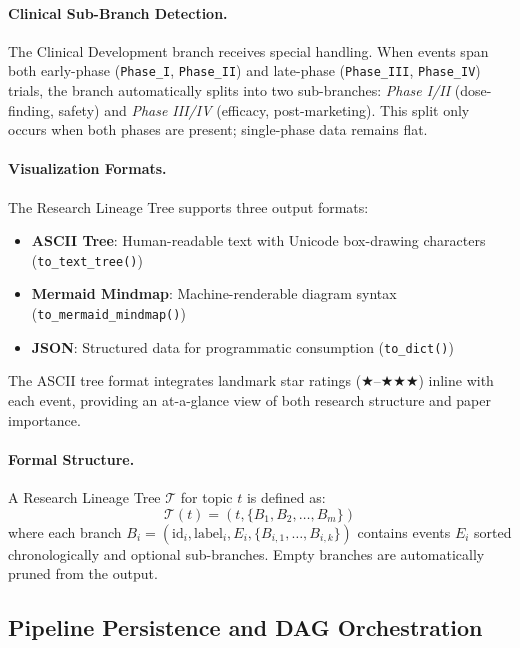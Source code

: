 \documentclass[11pt,a4paper]{article}
\begin{document}
\paragraph{Clinical Sub-Branch Detection.}
The Clinical Development branch receives special handling.
When events span both early-phase (\texttt{Phase\_I}, \texttt{Phase\_II}) and late-phase (\texttt{Phase\_III}, \texttt{Phase\_IV}) trials, the branch automatically splits into two sub-branches:
\emph{Phase I/II} (dose-finding, safety) and \emph{Phase III/IV} (efficacy, post-marketing).
This split only occurs when both phases are present; single-phase data remains flat.

\paragraph{Visualization Formats.}
The Research Lineage Tree supports three output formats:
\begin{itemize}
    \item \textbf{ASCII Tree}: Human-readable text with Unicode box-drawing characters (\texttt{to\_text\_tree()})
    \item \textbf{Mermaid Mindmap}: Machine-renderable diagram syntax (\texttt{to\_mermaid\_mindmap()})
    \item \textbf{JSON}: Structured data for programmatic consumption (\texttt{to\_dict()})
\end{itemize}

The ASCII tree format integrates landmark star ratings ($\bigstar$--$\bigstar\bigstar\bigstar$) inline with each event, providing an at-a-glance view of both research structure and paper importance.

\paragraph{Formal Structure.}
A Research Lineage Tree $\mathcal{T}$ for topic $t$ is defined as:
\begin{equation}
\mathcal{T}(t) = (t, \{B_1, B_2, \ldots, B_m\})
\label{eq:tree}
\end{equation}
where each branch $B_i = (\text{id}_i, \text{label}_i, E_i, \{B_{i,1}, \ldots, B_{i,k}\})$ contains events $E_i$ sorted chronologically and optional sub-branches.
Empty branches are automatically pruned from the output.

\subsection{Pipeline Persistence and DAG Orchestration}
\label{sec:pipeline}
\end{document}
